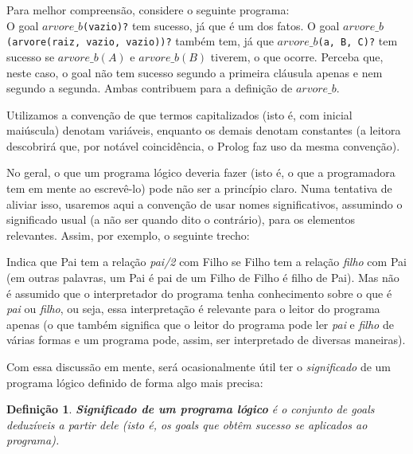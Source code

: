 \documentclass{article}
\newtheorem{definition}{Definição}[section]
\theoremstyle{remark}
\begin{document}
Para melhor compreensão, considere o seguinte programa:\\



O goal {\tt $arvore\_b$(vazio)?} tem sucesso, já que é um dos fatos. O goal {\tt $arvore\_b$(arvore(raiz, vazio, vazio))?} também tem, já que {\tt $arvore\_b$(a, B, C)?} tem sucesso se $arvore\_b(A)$ e $arvore\_b(B)$ tiverem, o que ocorre. Perceba que, neste caso, o goal não tem sucesso segundo a primeira cláusula apenas e nem segundo a segunda. Ambas contribuem para a definição de $arvore\_b$.

Utilizamos a convenção de que termos capitalizados (isto é, com inicial maiúscula) denotam variáveis, enquanto os demais denotam constantes (a leitora descobrirá que, por notável coincidência, o Prolog faz uso da mesma convenção).

No geral, o que um programa lógico deveria fazer (isto é, o que a programadora tem em mente ao escrevê-lo) pode não ser a princípio claro. Numa tentativa de aliviar isso, usaremos aqui a convenção de usar nomes significativos, assumindo o significado usual (a não ser quando dito o contrário), para os elementos relevantes. Assim, por exemplo, o seguinte trecho:


\label{lst:pai_filho}


Indica que Pai tem a relação \textit{pai/2} com Filho se Filho tem a relação \textit{filho} com Pai (em outras palavras, um Pai é pai de um Filho de Filho é filho de Pai). Mas não é assumido que o interpretador do programa tenha conhecimento sobre o que é \textit{pai} ou \textit{filho}, ou seja, essa interpretação é relevante para o leitor do programa apenas (o que também significa que o leitor do programa pode ler \textit{pai} e \textit{filho} de várias formas e um programa pode, assim,
ser interpretado de diversas maneiras).

Com essa discussão em mente, será ocasionalmente útil ter o \textit{significado} de um programa lógico definido de forma algo mais precisa:

  \theoremstyle{definition}
  \begin{definition} \textbf{Significado de um programa lógico} é o conjunto de goals deduzíveis a partir dele (isto é, os goals que obtêm sucesso se aplicados ao programa).
  \end{definition}
\end{document}
